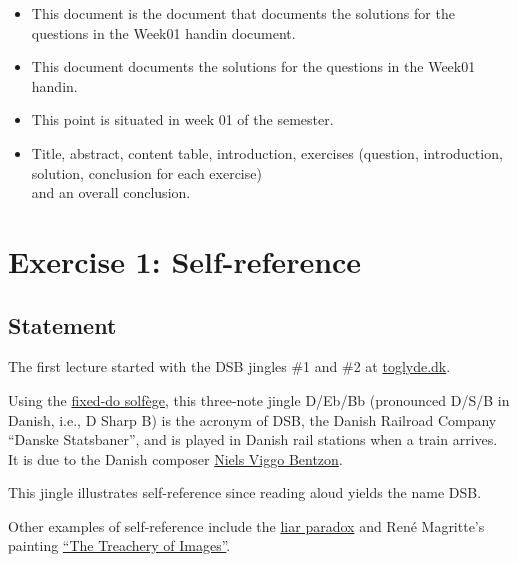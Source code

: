 \documentclass[12pt]{article}
\begin{document}
\begin{itemize}

\item
  This document is the document that documents the solutions for the questions in the Week01 handin document.

\item
  This document documents the solutions for the questions in the Week01 handin.

\item
  This point is situated in week 01 of the semester.

\item
  Title, abstract, content table, introduction, exercises (question, introduction, solution, conclusion for each exercise) \\ and an overall conclusion.

\end{itemize}


\newpage

\section{Exercise 1: Self-reference}


\subsection{Statement}

The first lecture started with the DSB jingles \#1 and \#2 at
\href{https://toglyde.dk/toglyde/stationslyde-inkl-hoejttalerudkald/}{toglyde.dk}.

Using the
\href{https://en.wikipedia.org/wiki/Solf\%C3\%A8ge\#Fixed_do_solf\%C3\%A8ge}{fixed-do solf\`ege},
this three-note jingle D/Eb/Bb (pronounced D/S/B in Danish, i.e., D Sharp B) is
the acronym of DSB, the Danish Railroad Company ``Danske Statsbaner'', and is
played in Danish rail stations when a train arrives. It is due to the Danish
composer
\href{https://en.wikipedia.org/wiki/Niels_Viggo_Bentzon}{Niels Viggo Bentzon}.

This jingle illustrates self-reference since reading aloud yields the name DSB.

Other examples of self-reference include the
\href{https://en.wikipedia.org/wiki/Liar_paradox}{liar paradox} and Ren\'e
Magritte's painting
\href{https://en.wikipedia.org/wiki/Ceci_n\%27est_pas_une_pipe}{``The Treachery of Images''}.
\end{document}
